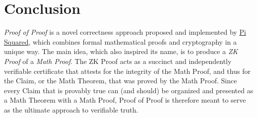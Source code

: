 \documentclass{article}
\theoremstyle{plain}
\theoremstyle{definition}
\begin{document}
\section{Conclusion}

\emph{Proof of Proof} is a novel correctness approach proposed and implemented by \href{https://pi2.network}{Pi Squared}, which combines formal mathematical proofs and cryptography in a unique way.  The main idea, which also inspired its name, is to produce a \emph{ZK Proof} of a \emph{Math Proof}.  The ZK Proof acts as a succinct and independently verifiable certificate that attests for the integrity of the Math Proof, and thus for the Claim, or the Math Theorem, that was proved by the Math Proof.  Since every Claim that is provably true can (and should) be organized and presented as a Math Theorem with a Math Proof, Proof of Proof is therefore meant to serve as the ultimate approach to verifiable truth.
\end{document}
